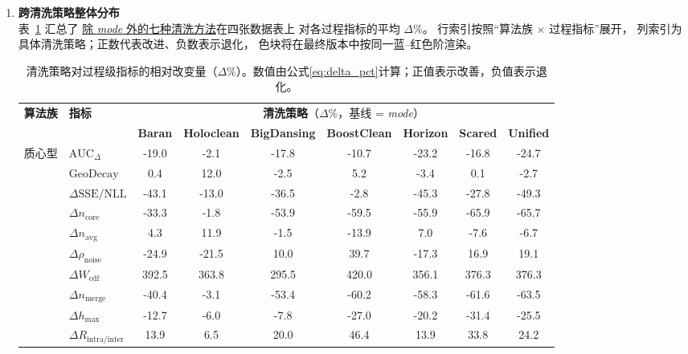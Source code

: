 \documentclass[10pt]{article} %
\numberwithin{equation}{section}
\begin{document}
\begin{enumerate}[label=(\alph*)]
\item \textbf{跨清洗策略整体分布}\\
表~\ref{tab:clean_vs_metric} 汇总了
\underline{除 \textit{mode} 外的七种清洗方法}在四张数据表上
对各过程指标的平均 $\Delta\%$。
行索引按照“算法族 $\times$ 过程指标”展开，
列索引为具体清洗策略；正数代表改进、负数表示退化，
色块将在最终版本中按同一蓝–红色阶渲染。

\begin{table}[t]
\centering
\small
\setlength{\tabcolsep}{5pt}
\renewcommand{\arraystretch}{1.15}
\begin{tabular}{@{}llccccccc@{}}
\toprule
\multirow{2}{*}{\textbf{算法族}} & \multirow{2}{*}{\textbf{指标}} &
\multicolumn{7}{c}{\textbf{清洗策略}（$\Delta\%$，基线 = \textit{mode}）}\\
\cmidrule(l){3-9}
 & & \textbf{Baran} & \textbf{Holoclean} & \textbf{BigDansing} & \textbf{BoostClean} &
   \textbf{Horizon} & \textbf{Scared} & \textbf{Unified}\\
\midrule
\multirow{3}{*}{质心型}
 & $\text{AUC}_{\Delta}$         &  -19.0 &   -2.1 &  -17.8 &  -10.7 &  -23.2 &  -16.8 &  -24.7\\
 & $\text{GeoDecay}$             &    0.4 &   12.0 &   -2.5 &    5.2 &   -3.4 &    0.1 &   -2.7\\
 & $\Delta\text{SSE/NLL}$        &  -43.1 &  -13.0 &  -36.5 &   -2.8 &  -45.3 &  -27.8 &  -49.3\\
\addlinespace[2pt]
\multirow{4}{*}{密度型}
 & $\Delta n_{\text{core}}$      &  -33.3 &   -1.8 &  -53.9 &  -59.5 &  -55.9 &  -65.9 &  -65.7\\
 & $\Delta n_{\text{avg}}$       &    4.3 &   11.9 &   -1.5 &  -13.9 &    7.0 &   -7.6 &   -6.7\\
 & $\Delta\rho_{\text{noise}}$   &  -24.9 &  -21.5 &   10.0 &   39.7 &  -17.3 &   16.9 &   19.1\\
 & $\Delta W_{\text{cdf}}$       &  392.5 &  363.8 &  295.5 &  420.0 &  356.1 &  376.3 &  376.3\\
\addlinespace[2pt]
\multirow{3}{*}{层次型}
 & $\Delta n_{\text{merge}}$     &  -40.4 &   -3.1 &  -53.4 &  -60.2 &  -58.3 &  -61.6 &  -63.5\\
 & $\Delta h_{\max}$             &  -12.7 &   -6.0 &   -7.8 &  -27.0 &  -20.2 &  -31.4 &  -25.5\\
 & $\Delta R_{\text{intra/inter}}$ &   13.9 &    6.5 &   20.0 &   46.4 &   13.9 &   33.8 &   24.2\\
\bottomrule
\end{tabular}
\caption{清洗策略对过程级指标的相对改变量（$\Delta\%$）。数值由公式\eqref{eq:delta_pct}计算；正值表示改善，负值表示退化。}
\label{tab:clean_vs_metric}
\end{table}


\end{enumerate}
\end{document}
